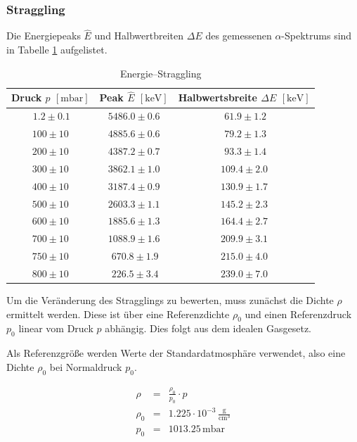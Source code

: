 \documentclass[12pt,a4paper]{scrartcl}
\numberwithin{equation}{section} %
\begin{document}
\hypertarget{energiestraggling-straggling}{%
	\subsubsection{Straggling}\label{energiestraggling-straggling}}
Die Energiepeaks $\hat E$ und Halbwertbreiten $\Delta E$ des gemessenen $\alpha$-Spektrums sind in Tabelle \ref{tabelle: Straggling} aufgelistet.
\begin{table}
	\centering
	\begin{tabular}[h]{||c|c|c||}
		\hline
		Druck $p$ $[\mathrm{mbar}]$ & Peak $\hat E$ $[\mathrm{keV}]$ & Halbwertsbreite $\Delta E$ $[\mathrm{keV}]$  \\
		\hline\hline
		$\ 1.2 \pm 0.1$ & $5486.0 \pm 0.6$ & $\ 61.9 \pm 1.2$ \\
		\hline
		$100 \pm 10$ & $4885.6 \pm 0.6$ & $\ 79.2 \pm 1.3$ \\
		\hline
		$200 \pm 10$ & $4387.2 \pm 0.7$ & $\ 93.3 \pm 1.4$ \\
		\hline
		$300 \pm 10$ & $3862.1 \pm 1.0$ & $109.4 \pm 2.0$ \\
		\hline
		$400 \pm 10$ & $3187.4 \pm 0.9$ & $130.9 \pm 1.7$ \\
		\hline
		$500 \pm 10$ & $2603.3 \pm 1.1$ & $145.2 \pm 2.3$ \\
		\hline
		$600 \pm 10$ & $1885.6 \pm 1.3$ & $164.4 \pm 2.7$ \\
		\hline
		$700 \pm 10$ & $1088.9 \pm 1.6$ & $209.9 \pm 3.1$ \\
		\hline
		$750 \pm 10$ & $\ 670.8 \pm 1.9$ & $215.0 \pm 4.0$ \\
		\hline
		$800 \pm 10$ & $\ 226.5 \pm 3.4$ & $239.0 \pm 7.0$ \\
		\hline
	\end{tabular}
	\caption{Energie--Straggling}
	\label{tabelle: Straggling}
\end{table}

Um die Veränderung des Stragglings zu bewerten, muss zunächst die Dichte $\rho$ ermittelt werden. Diese ist über eine Referenzdichte $\rho_0$ und einen Referenzdruck $p_0$ linear vom Druck $p$ abhängig.  Dies folgt aus dem idealen Gasgesetz.

Als Referenzgröße werden Werte der Standardatmosphäre verwendet, also eine Dichte $\rho_0$ bei Normaldruck $p_0$. \cite{DWD}

\begin{eqnarray}
	\rho &=& \frac{\rho_0}{p_0} \cdot p \\
	\rho_0 &=& 1.225 \cdot 10^{-3}\mathrm{\,\frac{g}{cm^3}} \\
	p_0 &=& 1013.25 \mathrm{\,mbar}
\end{eqnarray}
\end{document}
